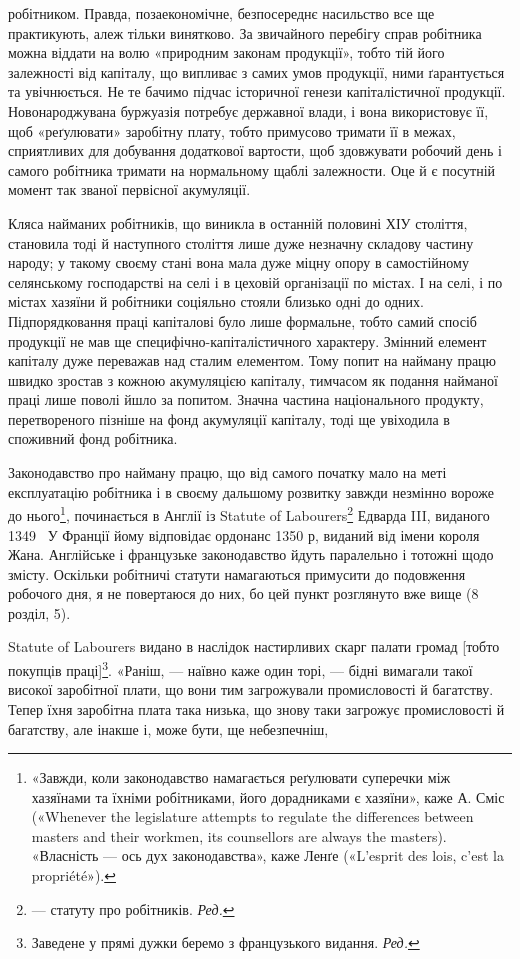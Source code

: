 \parcont{}  %
робітником. Правда, позаекономічне, безпосереднє насильство
все ще практикують, алеж тільки винятково. За звичайного
перебігу справ робітника можна віддати на волю «природним
законам продукції», тобто тій його залежності від капіталу,
що випливає з самих умов продукції, ними ґарантується та увічнюється.
Не те бачимо підчас історичної генези капіталістичної
продукції. Новонароджувана буржуазія потребує державної
влади, і вона використовує її, щоб «реґулювати» заробітну плату,
тобто примусово тримати її в межах, сприятливих для добування
додаткової вартости, щоб здовжувати робочий день і самого робітника
тримати на нормальному щаблі залежности. Оце й є
посутній момент так званої первісної акумуляції.

Кляса найманих робітників, що виникла в останній половині
ХІУ століття, становила тоді й наступного століття лише дуже
незначну складову частину народу; у такому своєму стані вона
мала дуже міцну опору в самостійному селянському господарстві
на селі і в цеховій організації по містах. І на селі, і по містах
хазяїни й робітники соціяльно стояли близько одні до одних.
Підпорядковання праці капіталові було лише формальне, тобто
самий спосіб продукції не мав ще специфічно-капіталістичного
характеру. Змінний елемент капіталу дуже переважав над сталим
елементом. Тому попит на найману працю швидко зростав
з кожною акумуляцією капіталу, тимчасом як подання найманої
праці лише поволі йшло за попитом. Значна частина національного
продукту, перетвореного пізніше на фонд акумуляції капіталу,
тоді ще увіходила в споживний фонд робітника.

Законодавство про найману працю, що від самого початку
мало на меті експлуатацію робітника і в своєму дальшому розвитку
завжди незмінно вороже до нього\footnote{
«Завжди, коли законодавство намагається реґулювати суперечки
між хазяїнами та їхніми робітниками, його дорадниками є хазяїни», каже
А. Сміс («Whenever the legislature attempts to regulate the differences
between masters and their workmen, its counsellors are always the masters).
«Власність — ось дух законодавства», каже Ленґе («L’esprit des
lois, c’est la propriété»).
}, починається в Англії
із Statute of Labourers\footnote*{
— статуту про робітників. \emph{Ред.}
} Едварда III, виданого 1349~ У Франції
йому відповідає ордонанс 1350 р, виданий від імени короля
Жана. Англійське і французьке законодавство йдуть паралельно
і тотожні щодо змісту. Оскільки робітничі статути намагаються
примусити до подовження робочого дня, я не повертаюся до них,
бо цей пункт розглянуто вже вище (8 розділ, 5).

Statute of Labourers видано в наслідок настирливих скарг
палати громад [тобто покупців праці]\footnote*{
Заведене у прямі дужки беремо з французького видання. \emph{Ред.}
}. «Раніш, — наївно каже
один торі, — бідні вимагали такої високої заробітної плати, що
вони тим загрожували промисловості й багатству. Тепер їхня
заробітна плата така низька, що знову таки загрожує промисловості
й багатству, але інакше і, може бути, ще небезпечніш,
\parbreak{}  %
